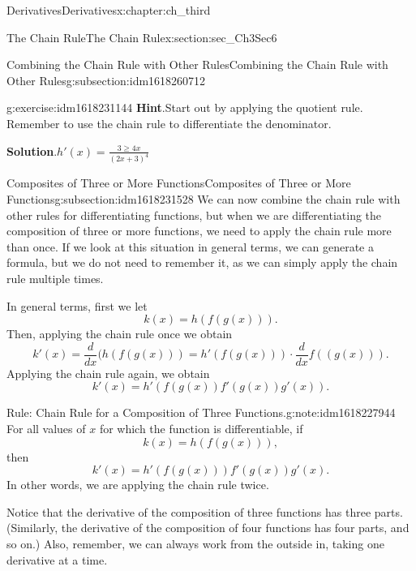 \documentclass[oneside,10pt,]{book}
\newcommand{\blocktitlefont}{\relax}
\numberwithin{equation}{section}
\begin{document}
\begin{chapterptx}{Derivatives}{}{Derivatives}{}{}{x:chapter:ch_third}
\begin{sectionptx}{The Chain Rule}{}{The Chain Rule}{}{}{x:section:sec_Ch3Sec6}
\begin{subsectionptx}{Combining the Chain Rule with Other Rules}{}{Combining the Chain Rule with Other Rules}{}{}{g:subsection:idm1618260712}
\begin{inlineexercise}{}{g:exercise:idm1618231144}
\noindent\textbf{\blocktitlefont Hint}.\hypertarget{g:hint:idm1618232168}{}\quad{}Start out by applying the quotient rule. Remember to use the chain rule to differentiate the denominator.%
\par\smallskip%
\noindent\textbf{\blocktitlefont Solution}.\hypertarget{g:solution:idm1618229864}{}\quad{}\(h'(x)=\frac{3\geq 4x}{(2x+3)^4}\)%
\end{inlineexercise}%
\end{subsectionptx}
%
%
\typeout{************************************************}
\typeout{************************************************}
%
\begin{subsectionptx}{Composites of Three or More Functions}{}{Composites of Three or More Functions}{}{}{g:subsection:idm1618231528}
We can now combine the chain rule with other rules for differentiating functions, but when we are differentiating the composition of three or more functions, we need to apply the chain rule more than once. If we look at this situation in general terms, we can generate a formula, but we do not need to remember it, as we can simply apply the chain rule multiple times.%
\par
In general terms, first we let%
%
\begin{equation*}
k(x)=h(f(g(x))).
\end{equation*}
Then, applying the chain rule once we obtain%
%
\begin{equation*}
k'(x)=\frac{d}{dx}(h(f(g(x)))=h'(f(g(x)))\cdot \frac{d}{dx}f((g(x))).
\end{equation*}
Applying the chain rule again, we obtain%
%
\begin{equation*}
k'(x)=h'(f(g(x))f'(g(x))g'(x)).
\end{equation*}
\begin{note}{Rule: Chain Rule for a Composition of Three Functions.}{g:note:idm1618227944}%
For all values of \(x\) for which the function is differentiable, if%
%
\begin{equation*}
k(x)=h(f(g(x))),
\end{equation*}
then%
%
\begin{equation*}
k'(x)=h'(f(g(x)))f'(g(x))g'(x).
\end{equation*}
In other words, we are applying the chain rule twice.%
\end{note}
Notice that the derivative of the composition of three functions has three parts. (Similarly, the derivative of the composition of four functions has four parts, and so on.) Also, remember, we can always work from the outside in, taking one derivative at a time.%

\end{subsectionptx}
\end{sectionptx}
\end{chapterptx}
\end{document}
